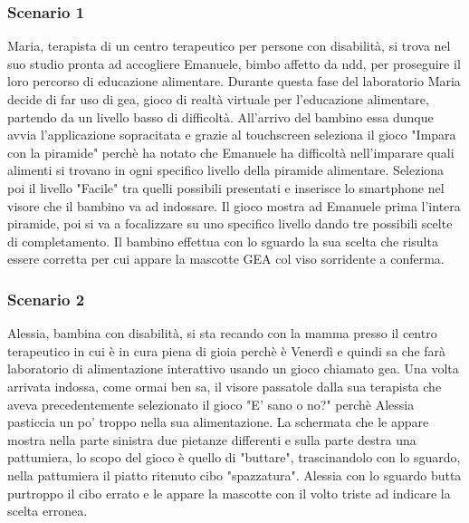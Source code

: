 \subsubsection{Scenario 1}
Maria, terapista di un centro terapeutico per persone con disabilità, si trova nel suo studio pronta ad accogliere Emanuele, bimbo affetto da \acs{ndd}, per proseguire il loro percorso di educazione alimentare. Durante questa fase del laboratorio Maria decide di far uso di \acs{gea}, gioco di realtà virtuale per l'educazione alimentare, partendo da un livello basso di difficoltà. All'arrivo del bambino essa dunque avvia l'applicazione sopracitata e grazie al touchscreen seleziona il gioco "Impara con la piramide" perchè ha notato che Emanuele ha difficoltà nell'imparare quali alimenti si trovano in ogni specifico livello della piramide alimentare. Seleziona poi il livello "Facile" tra quelli possibili presentati e inserisce lo smartphone nel visore che il bambino va ad indossare. Il gioco mostra ad Emanuele prima l'intera piramide, poi si va a focalizzare su uno specifico livello dando tre possibili scelte di completamento. Il bambino effettua con lo sguardo la sua scelta che risulta essere corretta per cui appare la mascotte GEA col viso sorridente a conferma.
\subsubsection{Scenario 2}
Alessia, bambina con disabilità, si sta recando con la mamma presso il centro terapeutico in cui è in cura piena di gioia perchè è Venerdì e quindi sa che farà laboratorio di alimentazione interattivo usando un gioco chiamato \acs{gea}. Una volta arrivata indossa, come ormai ben sa, il visore passatole dalla sua terapista che aveva precedentemente selezionato il gioco "E' sano o no?" perchè Alessia pasticcia un po' troppo nella sua alimentazione. La schermata che le appare mostra nella parte sinistra due pietanze differenti e sulla parte destra una pattumiera, lo scopo del gioco è quello di "buttare", trascinandolo con lo sguardo, nella pattumiera il piatto ritenuto cibo "spazzatura". Alessia con lo sguardo butta purtroppo il cibo errato e le appare la mascotte con il volto triste ad indicare la scelta erronea.
\clearpage
